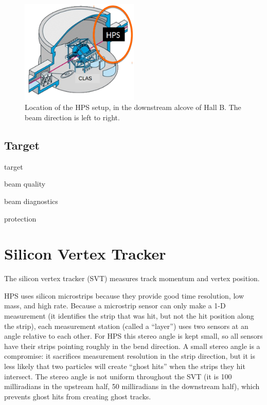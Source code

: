 \begin{figure}[ht]
    \begin{center}
        \includegraphics[width=0.5\textwidth]{detector/figs/hallb}
    \end{center}
    \caption{Location of the HPS setup, in the downstream alcove of Hall B.
    The beam direction is left to right.}
    \label{fig:hallb}
\end{figure}


\subsection{Target}

target

beam quality

beam diagnostics

protection

\section{Silicon Vertex Tracker}
The silicon vertex tracker (SVT) measures track momentum and vertex position.

HPS uses silicon microstrips because they provide good time resolution, low mass, and high rate.
Because a microstrip sensor can only make a 1-D measurement (it identifies the strip that was hit, but not the hit position along the strip), each measurement station (called a ``layer'') uses two sensors at an angle relative to each other.
For HPS this stereo angle is kept small, so all sensors have their strips pointing roughly in the bend direction.
A small stereo angle is a compromise: it sacrifices measurement resolution in the strip direction, but it is less likely that two particles will create ``ghost hits'' when the strips they hit intersect.
The stereo angle is not uniform throughout the SVT (it is 100 milliradians in the upstream half, 50 milliradians in the downstream half), which prevents ghost hits from creating ghost tracks.

